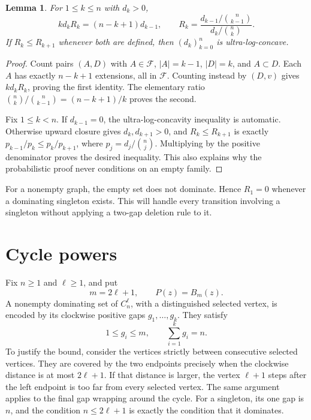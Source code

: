 \documentclass[11pt]{article}
\newtheorem{lemma}[theorem]{Lemma}
\theoremstyle{definition}
\theoremstyle{remark}
\begin{document}
\begin{lemma}\label{lem:deletion}
For $1\leq k\leq n$ with $d_k>0$,
\begin{equation}\label{eq:deletion}
 k d_k R_k=(n-k+1)d_{k-1},\qquad
 R_k=\frac{d_{k-1}/\binom n{k-1}}{d_k/\binom nk}.
\end{equation}
If $R_k\leq R_{k+1}$ whenever both are defined, then $(d_k)_{k=0}^n$ is
ultra-log-concave.
\end{lemma}

\begin{proof}
Count pairs $(A,D)$ with $A\in\mathcal F$, $|A|=k-1$, $|D|=k$, and
$A\subset D$. Each $A$ has exactly $n-k+1$ extensions, all in
$\mathcal F$. Counting instead by $(D,v)$ gives $k d_k R_k$, proving the
first identity. The elementary ratio
$\binom nk/\binom n{k-1}=(n-k+1)/k$ proves the second.

Fix $1\leq k<n$. If $d_{k-1}=0$, the ultra-log-concavity inequality is
automatic. Otherwise upward closure gives $d_k,d_{k+1}>0$, and
$R_k\leq R_{k+1}$ is exactly
$p_{k-1}/p_k\leq p_k/p_{k+1}$, where $p_j=d_j/\binom nj$.
Multiplying by the positive denominator proves the desired inequality.
This also explains why the probabilistic proof never conditions on an
empty family.
\end{proof}

For a nonempty graph, the empty set does not dominate. Hence $R_1=0$
whenever a dominating singleton exists. This will handle every transition
involving a singleton without applying a two-gap deletion rule to it.

\section{Cycle powers}\label{sec:cycle}

Fix $n\geq1$ and $\ell\geq1$, and put
\[
 m=2\ell+1,\qquad P(z)=B_m(z).
\]
A nonempty dominating set of $C_n^\ell$, with a distinguished selected
vertex, is encoded by its clockwise positive gaps $g_1,\ldots,g_k$.
They satisfy
\begin{equation}\label{eq:cyclic-gaps}
 1\leq g_i\leq m,\qquad \sum_{i=1}^k g_i=n.
\end{equation}
To justify the bound, consider the vertices strictly between consecutive
selected vertices. They are covered by the two endpoints precisely when
the clockwise distance is at most $2\ell+1$. If that distance is larger,
the vertex $\ell+1$ steps after the left endpoint is too far from every
selected vertex. The same argument applies to the final gap wrapping
around the cycle. For a singleton, its one gap is $n$, and the condition
$n\leq2\ell+1$ is exactly the condition that it dominates.
\end{document}
